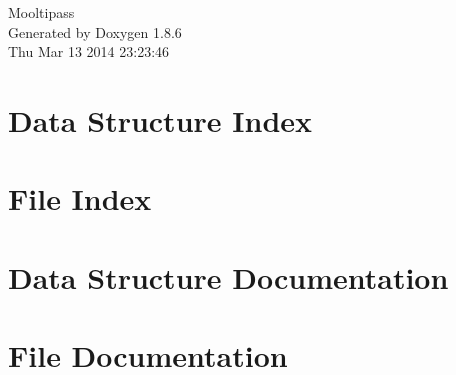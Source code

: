 \documentclass[twoside]{book}
\newcommand{\clearemptydoublepage}{%
  \newpage{\pagestyle{empty}\cleardoublepage}%
}
\begin{document}
\hypersetup{pageanchor=false}
\begin{titlepage}
\vspace*{7cm}
\begin{center}%
{\Large Mooltipass }\\
\vspace*{1cm}
{\large Generated by Doxygen 1.8.6}\\
\vspace*{0.5cm}
{\small Thu Mar 13 2014 23:23:46}\\
\end{center}
\end{titlepage}
\clearemptydoublepage
\tableofcontents
\clearemptydoublepage
{}
\hypersetup{pageanchor=true}

\chapter{Data Structure Index}

\chapter{File Index}

\chapter{Data Structure Documentation}









\chapter{File Documentation}




























\newpage
{}
{}
\printindex
\end{document}
